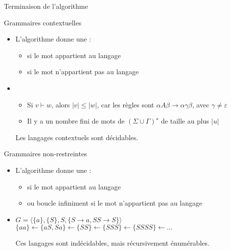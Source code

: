 
\begingroup


\begin{frame}[fragile]{Terminaison de l'algorithme}

  \begin{block}{Grammaires contextuelles}
    \begin{itemize}
    \item L'algorithme donne une  :
      \begin{itemize}
      \item \alert{\True} si le mot appartient au langage
      \item \alert{\False} si le mot n'appartient pas au langage
      \end{itemize}
    \item {}
      \begin{itemize}
      \item Si $v \vdash w$, alors $|v| \le |w|$, car les règles sont $\alpha A \beta \rightarrow \alpha \gamma \beta$, avec $\gamma\neq \varepsilon$
      \item Il y a un nombre fini de mots de $(\Sigma \cup \Gamma)^\star$ de taille au plus $|u|$
      \end{itemize}
      \begin{center}
        Les langages contextuels sont \alert{décidables}.
      \end{center}
    \end{itemize}
  \end{block}
  \pause
  \begin{block}{Grammaires non-restreintes}
    \begin{itemize}
    \item L'algorithme donne une  :
      \begin{itemize}
      \item \alert{\True} si le mot appartient au langage
      \item \alert{\False} ou \alert{boucle infiniment} si le mot n'appartient pas au langage
      \end{itemize}
    \item {} {\footnotesize$G = \langle \{a\}, \{S\}, S, \{S \rightarrow a, SS \rightarrow S\}\rangle$\\
      $\{aa\} \leftarrow \{aS, Sa\} \leftarrow \{SS\} \leftarrow \{SSS\} \leftarrow \{SSSS\} \leftarrow ...$}
      \begin{center}
        Ces langages sont \alert{indécidables}, mais \alert{récursivement énumérables}.
      \end{center}
    \end{itemize}      
  \end{block}

\end{frame}
 

\endgroup
